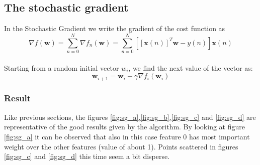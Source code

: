 \documentclass[a4paper,12pt,oneside,titlepage]{article}
\begin{document}
	\subsection{The stochastic gradient}
	In the Stochastic Gradient we write the gradient of the cost function as
	\begin{equation}\label{2.8}
	\nabla f ( \mathbf { w } ) = \sum _ { n = 0 } ^ { N } \nabla f _ { n } ( \mathbf { w } ) = \sum _ { n = 0 } ^ { N } [ [ \mathbf { x } ( n ) ] ^ { T } \mathbf { w } - y ( n ) ] \mathbf { x } ( n )
	\end{equation}\\
	Starting from a random initial vector $w_{i}$, we find the next value of the vector as:
	\begin{equation}\label{2.9}
	\mathbf { w } _ { i + 1 } = \mathbf { w } _ { i } - \gamma \nabla f _ { i } ( \mathbf { w } _ { i } )
	\end{equation}
	\subsubsection{Result}
	Like previous sections, the figures \ref{fig:sg_a},\ref{fig:sg_b},\ref{fig:sg_c} and \ref{fig:sg_d} are representative of the good results given by the algorithm. By looking at figure \ref{fig:sg_a} it can be observed that also in this case feature 0 has most important weight over the other features (value of about 1).
	Points scattered in figures \ref{fig:sg_c} and \ref{fig:sg_d} this time seem a bit disperse.
	
\end{document}
